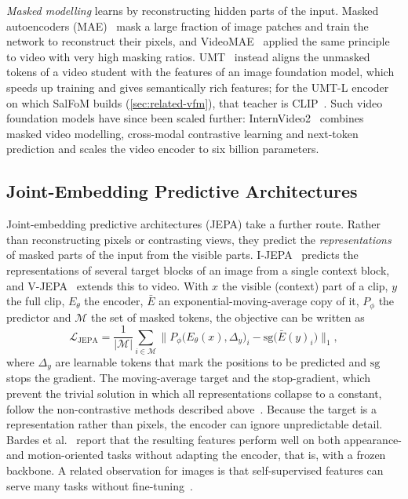 \emph{Masked modelling} learns by reconstructing hidden parts of the input.
Masked autoencoders (\acrshort{MAE})~\cite{he2022masked} mask a large fraction of image
patches and train the network to reconstruct their pixels, and
VideoMAE~\cite{tong2022videomae} applied the same principle to video with very
high masking ratios. \acrshort{UMT}~\cite{li2023unmasked} instead aligns the unmasked tokens
of a video student with the features of an image foundation model, which speeds
up training and gives semantically rich features; for the \acrshort{UMT}-L encoder on which
SalFoM builds (\cref{sec:related-vfm}), that teacher is CLIP~\cite{moradi2024salfom}. Such video foundation models have since been scaled
further: InternVideo2~\cite{wang2024internvideo2} combines masked video
modelling, cross-modal contrastive learning and next-token prediction and scales
the video encoder to six billion parameters.

\subsection{Joint-Embedding Predictive Architectures}\label{sec:jepa}

Joint-embedding predictive architectures (\acrshort{JEPA}) take a further route. Rather than
reconstructing pixels or contrasting views, they predict the
\emph{representations} of masked parts of the input from the visible parts.
I-\acrshort{JEPA}~\cite{assran2023self} predicts the representations of several target
blocks of an image from a single context block, and
\acrshort{V-JEPA}~\cite{bardes2024revisiting} extends this to video. With $x$ the visible
(context) part of a clip, $y$ the full clip, $E_\theta$ the encoder,
$\bar E$ an exponential-moving-average copy of it, $P_\phi$ the predictor and
$\mathcal{M}$ the set of masked tokens, the objective can be written
as~\cite{murlabadia2026vjepa21}
\begin{equation}
  \mathcal{L}_{\mathrm{JEPA}} = \frac{1}{|\mathcal{M}|}\sum_{i\in\mathcal{M}}
  \big\| P_\phi\big(E_\theta(x),\Delta_y\big)_i - \mathrm{sg}\big(\bar E(y)_i\big)\big\|_1,
  \label{eq:jepa}
\end{equation}
where $\Delta_y$ are learnable tokens that mark the positions to be predicted and
$\mathrm{sg}$ stops the gradient. The moving-average target and the stop-gradient,
which prevent the trivial solution in which all representations collapse to a
constant, follow the non-contrastive methods described
above~\cite{grill2020bootstrap,murlabadia2026vjepa21}. Because the target is a
representation rather than pixels, the encoder can ignore unpredictable detail.
Bardes et al.~\cite{bardes2024revisiting} report that the resulting features
perform well on both appearance- and motion-oriented tasks without adapting the
encoder, that is, with a frozen backbone. A related observation for images is
that self-supervised features can serve many tasks without
fine-tuning~\cite{oquab2024dinov2}.

